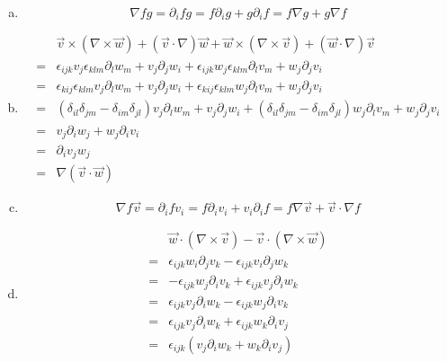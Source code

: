 \documentclass[a4paper,german,12pt,smallheadings]{scrartcl}
\begin{document}
\begin{enumerate}[a)]
  \item
    \begin{equation}
      \nabla fg = \partial_i f g = f \partial_i g + g \partial_i f = f \nabla g + g \nabla f
    \end{equation}
  \item
    \begin{align}
      &\vec{v} \times (\nabla \times \vec{w}) + (\vec{v} \cdot \nabla) \vec{w} + \vec{w} \times (\nabla \times \vec{v}) + (\vec{w} \cdot \nabla) \vec{v} \\
      = &\epsilon_{ijk} v_j \epsilon_{klm} \partial_l w_m + v_j \partial_j w_i + \epsilon_{ijk} w_j \epsilon_{klm} \partial_l v_m + w_j \partial_j v_i\\
      = &\epsilon_{kij} \epsilon_{klm} v_j \partial_l w_m + v_j \partial_j w_i + \epsilon_{kij} \epsilon_{klm} w_j \partial_l v_m + w_j \partial_j v_i\\
      = &(\delta_{il} \delta_{jm} - \delta_{im} \delta_{jl}) v_j \partial_l w_m + v_j \partial_j w_i + (\delta_{il} \delta_{jm} - \delta_{im}\delta_{jl}) w_j \partial_l v_m + w_j \partial_j v_i\\
      = &v_j \partial_i w_j + w_j \partial_i v_i\\
      = &\partial_i v_j w_j\\
      = &\nabla(\vec{v} \cdot \vec{w})
    \end{align}
  \item
    \begin{equation}
      \nabla f \vec{v}
      = \partial_i f v_i
      = f \partial_i v_i + v_i \partial_i f
      = f \nabla \vec{v} + \vec{v} \cdot \nabla f
    \end{equation}
  \item
    \begin{align}
      &\vec{w} \cdot (\nabla \times \vec{v}) - \vec{v} \cdot (\nabla \times \vec{w}) \\
      =  &\epsilon_{ijk}w_i\partial_jv_k - \epsilon_{ijk} v_i \partial_j w_k \\
      = &-\epsilon_{ijk} w_j \partial_ iv_k + \epsilon_{ijk} v_j \partial_i w_k \\
      =  &\epsilon_{ijk} v_j \partial_i w_k - \epsilon_{ijk} w_j \partial_i v_k \\
      =  &\epsilon_{ijk} v_j \partial_i w_k + \epsilon_{ijk} w_k \partial_i v_j \\
      =  &\epsilon_{ijk} (v_j \partial_i w_k + w_k \partial_i v_j) \\

\end{align}
\end{enumerate}
\end{document}
